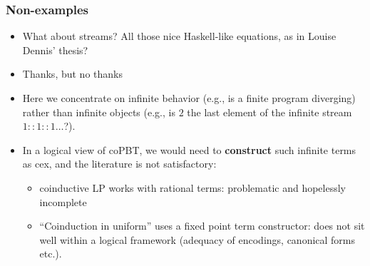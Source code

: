 \documentclass{beamer}
\newcommand{\red}[1]{{\color{red} #1}}
\begin{document}
\begin{frame}
  \frametitle{\textbf{Non}-examples}
  \begin{itemize}
  \item What about \red{streams}? All those nice Haskell-like equations, as in Louise Dennis' thesis?
    \pause
  \item Thanks, but no thanks
    \pause
  \item Here we concentrate on \red{infinite behavior} (e.g.,
    is a finite program diverging) rather than \red{infinite objects}
    (e.g., is $2$ the last element of the infinite stream $1::1::1\dots$?).
  \item In a logical view of coPBT, we would need to
    \textbf{construct} such infinite terms as cex, and the literature is not satisfactory:
    \pause
    \begin{itemize}
    \item coinductive LP works with rational terms: problematic and hopelessly incomplete
\pause
    \item ``Coinduction in uniform'' uses a fixed point term
      constructor: does not sit well within a logical framework
      (adequacy of encodings, canonical forms etc.).
    \end{itemize}
  \end{itemize}
\end{frame}



  
\end{document}
